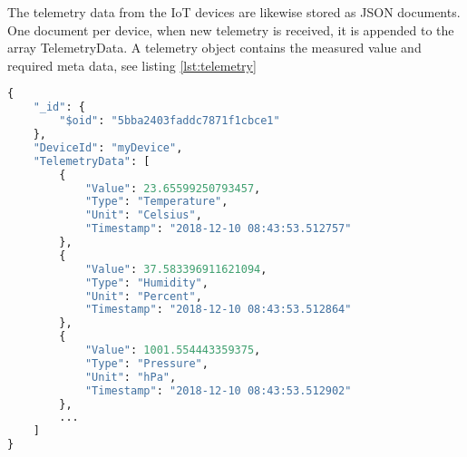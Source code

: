 The telemetry data from the IoT devices are likewise stored as JSON documents. One document per device, when new telemetry is received, it is appended to the array TelemetryData. A telemetry object contains the measured value and required meta data, see listing \ref{lst:telemetry} 

\begin{lstlisting}[language=Python, caption=Telemetry Data, label={lst:telemetry}, basicstyle=\scriptsize]
{
    "_id": {
        "$oid": "5bba2403faddc7871f1cbce1"
    },
    "DeviceId": "myDevice",
    "TelemetryData": [
        {
            "Value": 23.65599250793457,
            "Type": "Temperature",
            "Unit": "Celsius",
            "Timestamp": "2018-12-10 08:43:53.512757"
        },
        {
            "Value": 37.583396911621094,
            "Type": "Humidity",
            "Unit": "Percent",
            "Timestamp": "2018-12-10 08:43:53.512864"
        },
        {
            "Value": 1001.554443359375,
            "Type": "Pressure",
            "Unit": "hPa",
            "Timestamp": "2018-12-10 08:43:53.512902"
        },
        ...
    ]
}
\end{lstlisting}